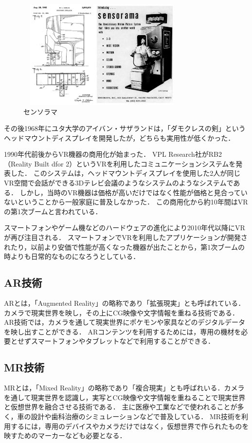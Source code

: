 \documentclass[12pt,a4j]{ltjsarticle}
\begin{document}
\begin{figure}[h]
\begin{center}
 \includegraphics[clip,width=85mm,height=55mm]{センソラマ.pdf}
\end{center}
 \caption{センソラマ}
 \label{fig:センソラマ.pdf}
\end{figure}

その後1968年にユタ大学のアイバン・サザランドは，「ダモクレスの剣」というヘッドマウントディスプレイを開発したが，どちらも実用性が低くかった\cite{VRの概念の登場}．

1990年代前後からVR機器の商用化が始まった．
VPL Research社がRB2（Reality Built dfor 2）というVRを利用したコミュニケーションシステムを発表した．
このシステムは，ヘッドマウントディスプレイを使用した2人が同じVR空間で会話ができる3Dテレビ会議のようなシステムのようなシステムである．
しかし，当時のVR機器は価格が高いだけではなく性能が価格と見合っていないということから一般家庭に普及しなかった．
この商用化から約10年間はVRの第1次ブームと言われている\cite{VRの初の商用化}．

スマートフォンやゲーム機などのハードウェアの進化により2010年代以降にVRが再び注目される\cite{VRの概念の登場}．
スマートフォンでVRを利用したアプリケーションが開発されたり，以前より安価で性能が高くなった機器が出たことから，第1次ブームの時よりも日常的なものになろうとしている．

\subsection{AR技術}
ARとは，「Augmented Reality」の略称であり「拡張現実」とも呼ばれている．カメラで現実世界を映し，その上にCG映像や文字情報を重ねる技術である．
AR技術では，カメラを通して現実世界にポケモンや家具などのデジタルデータを映し出すことができる．
ARコンテンツを利用するためには，専用の機材を必要とせずスマートフォンやタブレットなどで利用することができる．

\subsection{MR技術}
MRとは，「Mixed Reality」の略称であり「複合現実」とも呼ばれいる．カメラを通して現実世界を認識し，実写とCG映像や文字情報を重ねることで現実世界と仮想世界を融合させる技術である．
主に医療や工業などで使われることが多く，車の設計や歯科治療のシミュレーションなどで普及している．
MR技術を利用するには，専用のデバイスやカメラだけではなく，仮想世界で作られたものを映すためのマーカーなども必要となる．
\end{document}
